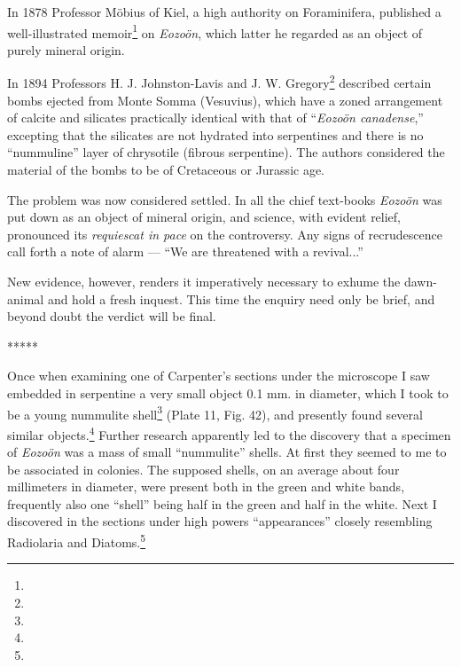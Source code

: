 \documentclass[a4paper, 12pt, oneside]{article}
\begin{document}
In 1878 Professor Möbius of Kiel, a high authority on Foraminifera, published a well-illustrated memoir\footnote{} on \emph{Eozoön}, which latter he regarded as an object of purely mineral origin.

In 1894 Professors H. J. Johnston-Lavis and J. W. Gregory\footnote{} described certain bombs ejected from Monte Somma (Vesuvius), which have a zoned arrangement of calcite and silicates practically identical with that of ``\emph{Eozoön canadense},'' excepting that the silicates are not hydrated into serpentines and there is no ``nummuline'' layer of chrysotile (fibrous serpentine). The authors considered the material of the bombs to be of Cretaceous or Jurassic age.

The problem was now considered settled. In all the chief text-books \emph{Eozoön} was put down as an object of mineral origin, and science, with evident relief, pronounced its \emph{requiescat in pace} on the controversy. Any signs of recrudescence call forth a note of alarm --- ``We are threatened with a revival...''

New evidence, however, renders it imperatively necessary to exhume the dawn-animal and hold a fresh inquest. This time the enquiry need only be brief, and beyond doubt the verdict will be final.

\centerline{*\hspace{15mm}*\hspace{15mm}*\hspace{15mm}*\hspace{15mm}*}
\bigskip

Once when examining one of Carpenter's sections under the microscope I saw embedded in serpentine a very small object 0.1 mm. in diameter, which I took to be a young nummulite shell\footnote{} (Plate 11, Fig. 42), and presently found several similar objects.\footnote{} Further research apparently led to the discovery that a specimen of \emph{Eozoön} was a mass of small ``nummulite'' shells. At first they seemed to me to be associated in colonies. The supposed shells, on an average about four millimeters in diameter, were present both in the green and white bands, frequently also one ``shell'' being half in the green and half in the white. Next I discovered in the sections under high powers ``appearances'' closely resembling Radiolaria and Diatoms.\footnote{}
\end{document}
